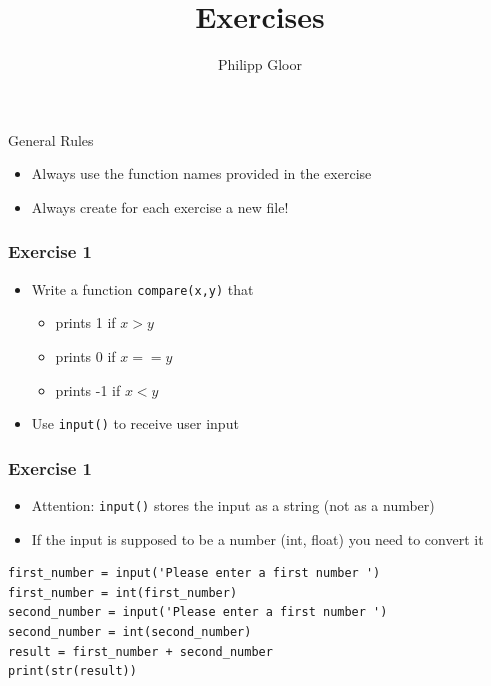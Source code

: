 \documentclass[10pt, a4paper]{beamer} %
\title %
{Exercises}
\author %
{Philipp Gloor\inst{1}}
\institute
{
  \inst{1}%
  University of Zurich
}
\date{}
\begin{document}
\begin{frame}
    \titlepage
\end{frame}

\begin{frame}{General Rules}
    \begin{itemize}
        \item Always use the function names provided in the exercise
        \item Always create for each exercise a new file!
    \end{itemize}

\end{frame}

{
\bfseries
\begin{frame}\frametitle{Exercise 1}

    \begin{itemize}
        \item Write a function \texttt{compare(x,y)} that
              \begin{itemize}
                  \item prints 1 if $x > y$
                  \item prints 0 if $x == y$
                  \item prints -1 if $x < y$
              \end{itemize}
        \item Use \texttt{input()} to receive user input
    \end{itemize}

\end{frame}
\begin{frame}\frametitle{Exercise 1}

    \begin{itemize}
        \item Attention: \texttt{input()} stores the input as a string (not as a number)
        \item If the input is supposed to be a number (int, float) you need to convert it
    \end{itemize}

    {
    \mdseries
    \begin{lstlisting}
first_number = input('Please enter a first number ')
first_number = int(first_number)
second_number = input('Please enter a first number ')
second_number = int(second_number)
result = first_number + second_number
print(str(result))
\end{lstlisting}
    }


\end{frame}}
\end{document}
